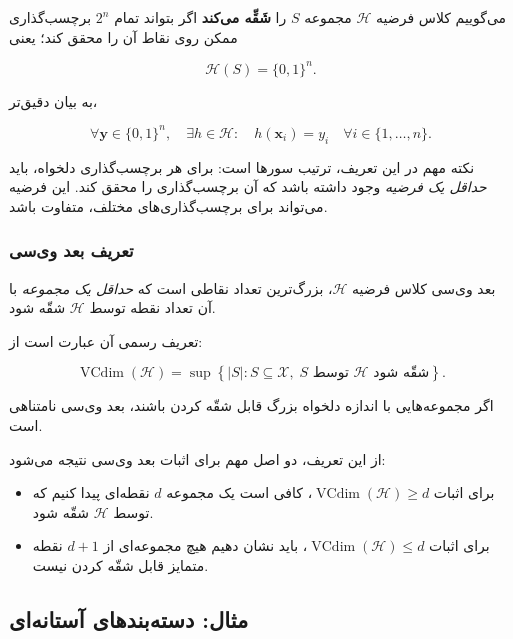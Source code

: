 \documentclass[12pt,a4paper]{article}
\begin{document}
می‌گوییم کلاس فرضیه $\mathcal{H}$
مجموعه $S$ را
\textbf{شَقِّه می‌کند}
اگر بتواند تمام $2^n$
برچسب‌گذاری ممکن روی نقاط آن را محقق کند؛ یعنی

\[
\boxed{
\mathcal{H}(S)=\{0,1\}^{n}.
}
\]

به بیان دقیق‌تر،

\[
\boxed{
\forall \mathbf{y}\in\{0,1\}^{n},
\quad
\exists h\in\mathcal{H}:
\quad
h(\mathbf{x}_i)=y_i
\quad
\forall i\in\{1,\ldots,n\}.
}
\]

نکته مهم در این تعریف، ترتیب سورها است:
برای هر برچسب‌گذاری دلخواه، باید
\textit{حداقل یک فرضیه} وجود داشته باشد
که آن برچسب‌گذاری را محقق کند.
این فرضیه می‌تواند برای برچسب‌گذاری‌های
مختلف، متفاوت باشد.

\subsubsection{تعریف بعد وی‌سی}

بعد وی‌سی کلاس فرضیه $\mathcal{H}$،
بزرگ‌ترین تعداد نقاطی است که
\textit{حداقل یک مجموعه} با آن تعداد نقطه
توسط $\mathcal{H}$ شقّه شود.

تعریف رسمی آن عبارت است از:

\[
\boxed{
\operatorname{VCdim}(\mathcal{H})
=
\sup
\left\{
|S|:
S\subseteq\mathcal{X},
\;
S \text{ توسط }\mathcal{H}
\text{ شقّه شود}
\right\}.
}
\]

اگر مجموعه‌هایی با اندازه دلخواه بزرگ
قابل شقّه کردن باشند، بعد وی‌سی نامتناهی است.

از این تعریف، دو اصل مهم برای اثبات
بعد وی‌سی نتیجه می‌شود:

\begin{itemize}

\item برای اثبات
$\operatorname{VCdim}(\mathcal{H})\geq d$،
کافی است یک مجموعه $d$ نقطه‌ای پیدا کنیم
که توسط $\mathcal{H}$ شقّه شود.

\item برای اثبات
$\operatorname{VCdim}(\mathcal{H})\leq d$،
باید نشان دهیم هیچ مجموعه‌ای از
$d+1$ نقطه متمایز قابل شقّه کردن نیست.

\end{itemize}



\subsection{مثال: دسته‌بندهای آستانه‌ای}
\end{document}
